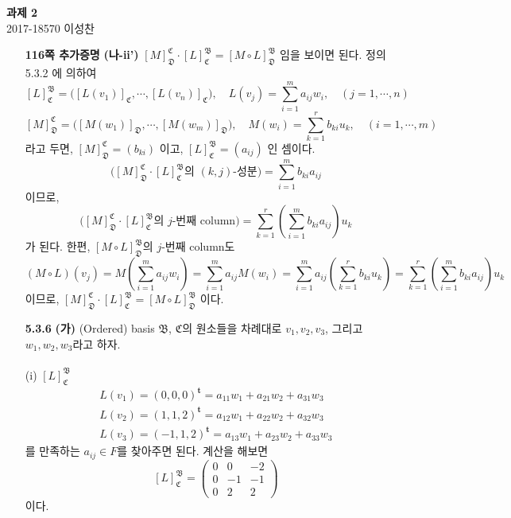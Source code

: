\documentclass{article}
\newcommand*{\trans}{^{\mathrm{\mathbf{t}}}}%
\newcommand*{\basisB}{\mathfrak{B}}%
\newcommand*{\basisC}{\mathfrak{C}}%
\newcommand*{\basisD}{\mathfrak{D}}%
\begin{document}
\begin{center}
\textbf{ 과제 2}\\
\large 2017-18570 이성찬
\end{center}

\begin{itemize}
\item[\textbf{116쪽 추가증명}] 
\textbf{(나-ii')} $\left[M\right]_{\basisD}^{\basisC}\cdot \left[L\right]_{\basisC}^{\basisB} = \left[M\circ L \right]_{\basisD}^{\basisB}$ 임을 보이면 된다. 정의 5.3.2 에 의하여 
$$\left[L \right] _{\basisC} ^{\basisB} = \big( \left[ L(v_1) \right] _{\basisC}, \cdots, \left[ L(v_n) \right] _{\basisC} \big), \quad L(v_j)=\sum_{i=1}^m a_{ij}w_i, \quad (j=1, \cdots, n)$$
$$\left[M \right] _{\basisD} ^{\basisC} = \big( \left[M(w_1) \right] _{\basisD}, \cdots, \left[ M(w_m) \right] _{\basisD} \big), \quad M(w_i)=\sum_{k=1}^r b_{ki}u_k, \quad (i=1, \cdots, m)$$
라고 두면, $[M]_{\mathfrak{D}} ^{\mathfrak{C}} = (b_{ki})$ 이고, $[L]_{\mathfrak{C}} ^{\mathfrak{B}}=(a_{ij})$ 인 셈이다.
$$\Big(\left[M\right]_{\mathfrak{D}}^{\mathfrak{C}}\cdot \left[L\right]_{\mathfrak{C}}^{\mathfrak{B}}\text{의 } (k, j)\text{-성분} \Big)= \sum_{i=1}^m b_{ki}a_{ij}$$
이므로, 
$$\Big(\left[M\right]_{\mathfrak{D}}^{\mathfrak{C}}\cdot \left[L\right]_{\mathfrak{C}}^{\mathfrak{B}}\text{의 } j\text{-번째 column} \Big) = \sum_{k=1}^{r} \left(\sum_{i=1}^{m} b_{ki}a_{ij}\right)u_k$$
가 된다. 한편, $\left[M\circ L \right]_{\mathfrak{D}}^{\mathfrak{B}}$의 $j$-번째 column도
$$(M\circ L)(v_j) = M\left(\sum_{i=1}^{m}a_{ij}w_i\right) = \sum_{i=1}^{m}a_{ij}M(w_i)=\sum_{i=1}^{m}a_{ij} \left(\sum_{k=1}^r b_{ki}u_k\right)=\sum_{k=1}^{r} \left(\sum_{i=1}^{m} b_{ki}a_{ij}\right)u_k$$
이므로, $\left[M\right]_{\mathfrak{D}}^{\mathfrak{C}}\cdot \left[L\right]_{\mathfrak{C}}^{\mathfrak{B}} = \left[M\circ L \right]_{\mathfrak{D}}^{\mathfrak{B}}$ 이다. \\

\item[\textbf{5.3.6}] \textbf{(가)}
(Ordered) basis $\basisB$, $\basisC$의 원소들을 차례대로 $v_1, v_2, v_3$, 그리고 $w_1, w_2, w_3$라고 하자. \\\\
(i) $[L]_{\basisC}^{\basisB}$
$$
\begin{aligned}
L(v_1) = (0, 0, 0)\trans = a_{11}w_1 + a_{21}w_2 + a_{31}w_3\\
L(v_2) = (1, 1, 2)\trans = a_{12}w_1 + a_{22}w_2 + a_{32}w_3\\
L(v_3) = (-1, 1, 2)\trans = a_{13}w_1 + a_{23}w_2 + a_{33}w_3
\end{aligned}
$$
를 만족하는 $a_{ij} \in F$를 찾아주면 된다. 계산을 해보면
$$
[L]_{\basisC}^{\basisB} = 
	\begin{pmatrix}
		0 & 0 & -2\\
		0 &-1 & -1\\
		0 & 2 & 2
	\end{pmatrix}
$$
이다.


\end{itemize}
\end{document}
